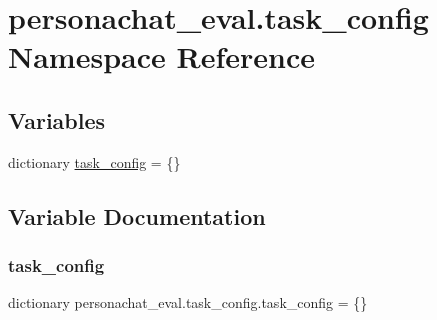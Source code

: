 \hypertarget{namespacepersonachat__eval_1_1task__config}{}\section{personachat\+\_\+eval.\+task\+\_\+config Namespace Reference}
\label{namespacepersonachat__eval_1_1task__config}
\subsection*{Variables}
\begin{DoxyCompactItemize}
\item 
dictionary \hyperlink{namespacepersonachat__eval_1_1task__config_a361167ac8a1e4f7e02f2afac16e10bc8}{task\+\_\+config} = \{\}
\end{DoxyCompactItemize}


\subsection{Variable Documentation}
\mbox{\label{namespacepersonachat__eval_1_1task__config_a361167ac8a1e4f7e02f2afac16e10bc8}} 
\subsubsection{\texorpdfstring{task\+\_\+config}{task\_config}}
{\footnotesize\ttfamily dictionary personachat\+\_\+eval.\+task\+\_\+config.\+task\+\_\+config = \{\}}


